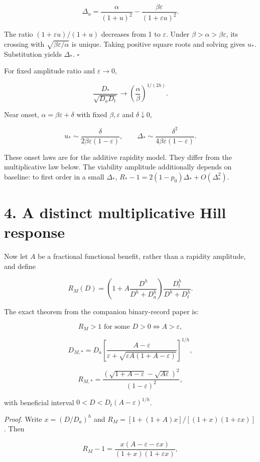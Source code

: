 \documentclass[
  11pt,
  a4paper,
]{article}
\begin{document}
\[\Delta_u=\frac\alpha{(1+u)^2}
-\frac{\beta\varepsilon}{(1+\varepsilon u)^2}.\]

The ratio \((1+\varepsilon u)/(1+u)\) decreases from 1 to \(\varepsilon\). Under \(\beta>\alpha>\beta\varepsilon\), its crossing with \(\sqrt{\beta\varepsilon/\alpha}\) is unique. Taking positive square roots and solving gives \(u_*\). Substitution yields \(\Delta_*\). \(\square\)

For fixed amplitude ratio and \(\varepsilon\to0\),

\[\frac{D_*}{\sqrt{D_aD_t}}
\longrightarrow\left(\frac\alpha\beta\right)^{1/(2h)}.\]

Near onset, \(\alpha=\beta\varepsilon+\delta\) with fixed \(\beta,\varepsilon\) and \(\delta\downarrow0\),

\[u_*\sim\frac{\delta}{2\beta\varepsilon(1-\varepsilon)},
\qquad\Delta_*\sim\frac{\delta^2}{4\beta\varepsilon(1-\varepsilon)}.\]

These onset laws are for the additive rapidity model. They differ from the multiplicative law below. The viability amplitude additionally depends on baseline: to first order in a small \(\Delta_*\), \(R_*-1=2(1-p_0)\Delta_*+O(\Delta_*^2)\).

\section{4. A distinct multiplicative Hill response}\label{a-distinct-multiplicative-hill-response}

Now let \(A\) be a fractional functional benefit, rather than a rapidity amplitude, and define

\[R_M(D)=\left(1+A\frac{D^h}{D^h+D_a^h}\right)
\frac{D_t^h}{D^h+D_t^h}.\]

The exact theorem from the companion binary-record paper is:

\[R_M>1\text{ for some }D>0\iff A>\varepsilon,\]

\[D_{M,*}=D_a\left[
\frac{A-\varepsilon}{\varepsilon+\sqrt{\varepsilon A(1+A-\varepsilon)}}
\right]^{1/h},\]

\[R_{M,*}=
\frac{(\sqrt{1+A-\varepsilon}-\sqrt{A\varepsilon})^2}{(1-\varepsilon)^2},\]

with beneficial interval \(0<D<D_t(A-\varepsilon)^{1/h}\).

\emph{Proof.} Write \(x=(D/D_a)^h\) and \(R_M=[1+(1+A)x]/[(1+x)(1+\varepsilon x)]\). Then

\[R_M-1=\frac{x(A-\varepsilon-\varepsilon x)}{(1+x)(1+\varepsilon x)},\]
\end{document}

